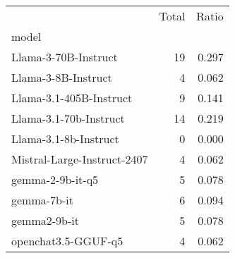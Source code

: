 \begin{tabular}{lrr}
 & Total & Ratio \\
model &  &  \\
Llama-3-70B-Instruct & 19 & 0.297 \\
Llama-3-8B-Instruct & 4 & 0.062 \\
Llama-3.1-405B-Instruct & 9 & 0.141 \\
Llama-3.1-70b-Instruct & 14 & 0.219 \\
Llama-3.1-8b-Instruct & 0 & 0.000 \\
Mistral-Large-Instruct-2407 & 4 & 0.062 \\
gemma-2-9b-it-q5 & 5 & 0.078 \\
gemma-7b-it & 6 & 0.094 \\
gemma2-9b-it & 5 & 0.078 \\
openchat3.5-GGUF-q5 & 4 & 0.062 \\
\end{tabular}
